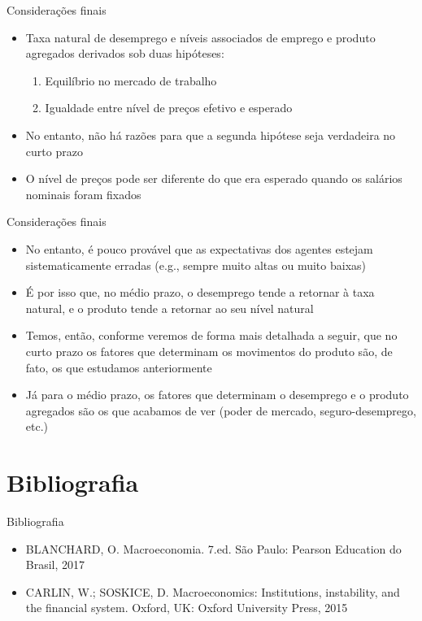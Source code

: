 \documentclass[10pt]{beamer}
\begin{document}
\begin{frame}
    {Considerações finais}
    \begin{itemize}
        \item Taxa natural de desemprego e níveis associados de emprego e produto agregados derivados sob duas hipóteses:\medskip
        \begin{enumerate}
            \item Equilíbrio no mercado de trabalho\medskip
            \item Igualdade entre nível de preços efetivo e esperado\bigskip
        \end{enumerate}
        \item No entanto, não há razões para que a segunda hipótese seja verdadeira no curto prazo\bigskip
        \item O nível de preços pode ser diferente do que era esperado quando os salários nominais foram fixados\bigskip
    \end{itemize}
\end{frame}

\begin{frame}
    {Considerações finais}
    \begin{itemize}
        \item No entanto, é pouco provável que as expectativas dos agentes estejam sistematicamente erradas (e.g., sempre muito altas ou muito baixas)\bigskip
        \item É por isso que, no médio prazo, o desemprego tende a retornar à taxa natural, e o produto tende a retornar ao seu nível natural\bigskip
        \item Temos, então, conforme veremos de forma mais detalhada a seguir, que no curto prazo os fatores que determinam os movimentos do produto são, de fato, os que estudamos anteriormente\bigskip
        \item Já para o médio prazo, os fatores que determinam o desemprego e o produto agregados são os que acabamos de ver (poder de mercado, seguro-desemprego, etc.)
    \end{itemize}
\end{frame}

\section{Bibliografia}
\begin{frame}{ Bibliografia}
    \begin{itemize}                
        \item BLANCHARD, O. Macroeconomia. 7.ed. São Paulo: Pearson Education do Brasil, 2017\medskip                
        \item CARLIN, W.; SOSKICE, D. Macroeconomics: Institutions, instability, and the financial system. Oxford, UK: Oxford University Press, 2015\medskip        
    \end{itemize}
\end{frame}
\end{document}
